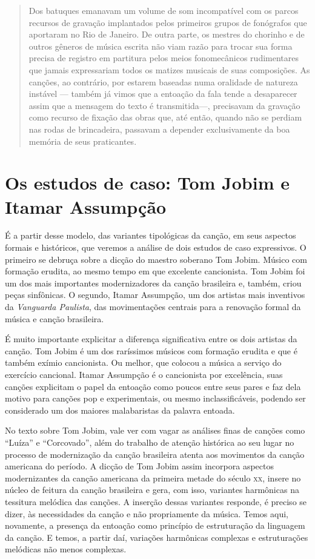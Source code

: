 \begin{quote}
Dos batuques emanavam um volume de som incompatível com os parcos
recursos de gravação implantados pelos primeiros grupos de fonógrafos
que aportaram no Rio de Janeiro. De outra parte, os mestres do chorinho
e de outros gêneros de música escrita não viam razão para trocar sua
forma precisa de registro em partitura pelos meios fonomecânicos
rudimentares que jamais expressariam todos os matizes musicais de suas
composições. As canções, ao contrário, por estarem baseadas numa
oralidade de natureza instável --- também já vimos que a entoação da fala
tende a desaparecer assim que a mensagem do texto é transmitida---,
precisavam da gravação como recurso de fixação das obras que, até então,
quando não se perdiam nas rodas de brincadeira, passavam a depender
exclusivamente da boa memória de seus praticantes.
\end{quote}

\section{Os estudos de caso: Tom Jobim e Itamar Assumpção}

É a partir desse modelo, das variantes tipológicas da canção, em seus
aspectos formais e históricos, que veremos a análise de dois estudos de
caso expressivos. O primeiro se debruça sobre a dicção do maestro
soberano Tom Jobim. Músico com formação erudita, ao mesmo tempo em que
excelente cancionista. Tom Jobim foi um dos mais importantes
modernizadores da canção brasileira e, também, criou peças sinfônicas. O
segundo, Itamar Assumpção, um dos artistas mais inventivos da
\emph{Vanguarda Paulista}, das movimentações centrais para a renovação
formal da música e canção brasileira.

É muito importante explicitar a diferença significativa entre os dois
artistas da canção. Tom Jobim é um dos raríssimos músicos com formação
erudita e que é também exímio cancionista. Ou melhor, que colocou a
música a serviço do exercício cancional. Itamar Assumpção é o
cancionista por excelência, suas canções explicitam o papel da entoação
como poucos entre seus pares e faz dela motivo para canções pop e
experimentais, ou mesmo inclassificáveis, podendo ser considerado um dos
maiores malabaristas da palavra entoada.

No texto sobre Tom Jobim, vale ver com vagar as análises finas de
canções como ``Luíza'' e ``Corcovado'', além do trabalho de atenção
histórica ao seu lugar no processo de modernização da canção brasileira
atenta aos movimentos da canção americana do período. A dicção de Tom
Jobim assim incorpora aspectos modernizantes da canção americana da
primeira metade do século \textsc{xx}, insere no núcleo de feitura da canção
brasileira e gera, com isso, variantes harmônicas na tessitura melódica
das canções. A inserção dessas variantes responde, é preciso se dizer,
às necessidades da canção e não propriamente da música. Temos aqui,
novamente, a presença da entoação como princípio de estruturação da
linguagem da canção. E temos, a partir daí, variações harmônicas
complexas e estruturações melódicas não menos complexas.

